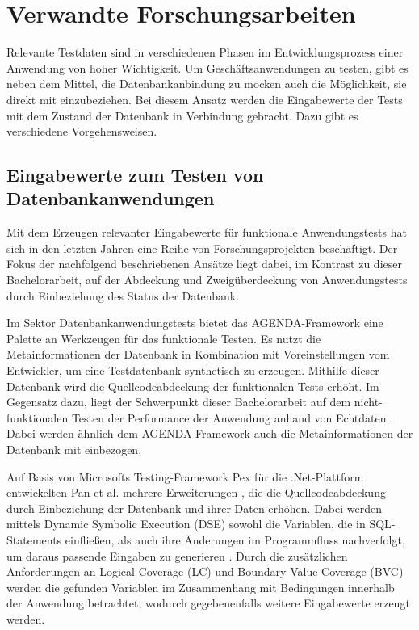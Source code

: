 \section{Verwandte Forschungsarbeiten}\label{chap:relatedwork}

%
%

Relevante Testdaten sind in verschiedenen Phasen im Entwicklungsprozess einer Anwendung von hoher Wichtigkeit.
Um Geschäftsanwendungen zu testen, gibt es neben dem Mittel, die Datenbankanbindung zu mocken \cite{Taneja:2010:MAT:1858996.1859053} auch die Möglichkeit, sie direkt mit einzubeziehen.
Bei diesem Ansatz werden die Eingabewerte der Tests mit dem Zustand der Datenbank in Verbindung gebracht.
Dazu gibt es verschiedene Vorgehensweisen.

\subsection{Eingabewerte zum Testen von Datenbankanwendungen}
Mit dem Erzeugen relevanter Eingabewerte für funktionale Anwendungstests hat sich in den letzten Jahren eine Reihe von Forschungsprojekten beschäftigt.
Der Fokus der nachfolgend beschriebenen Ansätze liegt dabei, im Kontrast zu dieser Bachelorarbeit, auf der Abdeckung und Zweigüberdeckung von Anwendungstests durch Einbeziehung des Status der Datenbank.

Im Sektor Datenbankanwendungstests bietet das AGENDA-Framework \cite{Chays:2000:FTD:347324.348954, Chays:2004:TDG:997669, Chays:2004:ATR:1077269.1077271, Deng:2005:TDT:1062455.1062486, Chays:2008:QTG:1385269.1385277} eine Palette an Werkzeugen für das funktionale Testen.
Es nutzt die Metainformationen der Datenbank in Kombination mit Voreinstellungen vom Entwickler, um eine Testdatenbank synthetisch zu erzeugen.
Mithilfe dieser Datenbank wird die Quellcodeabdeckung der funktionalen Tests erhöht.
Im Gegensatz dazu, liegt der Schwerpunkt dieser Bachelorarbeit auf dem nicht-funktionalen Testen der Performance der Anwendung anhand von Echtdaten.
Dabei werden ähnlich dem AGENDA-Framework auch die Metainformationen der Datenbank mit einbezogen.

Auf Basis von Microsofts Testing-Framework Pex für die .Net-Plattform \cite{Tillmann:2008:PWB:1792786.1792798} entwickelten Pan et al. mehrere Erweiterungen \cite{Pan:2011:GPI:2190078.2190154, Pan:2011:DSG:1988842.1988846}, die die Quellcodeabdeckung durch Einbeziehung der Datenbank und ihrer Daten erhöhen.
Dabei werden mittels Dynamic Symbolic Execution (DSE) \cite{Cadar:2006:EAG:1180405.1180445, Godefroid:2005:DDA:1065010.1065036} sowohl die Variablen, die in SQL-Statements einfließen, als auch ihre Änderungen im Programmfluss nachverfolgt, um daraus passende Eingaben zu generieren \cite{Pan:2011:GPI:2190078.2190154}.
Durch die zusätzlichen Anforderungen an Logical Coverage (LC) \cite{DBLP:conf/issre/AmmannOH03} und Boundary Value Coverage (BVC) \cite{DBLP:conf/issre/KosmatovLPU04} werden die gefunden Variablen im Zusammenhang mit Bedingungen innerhalb der Anwendung betrachtet, wodurch gegebenenfalls weitere Eingabewerte erzeugt werden.

